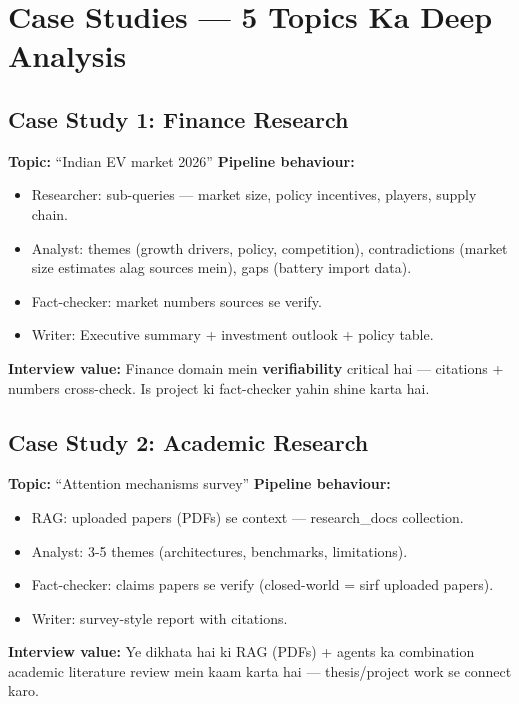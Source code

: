 \section{Case Studies --- 5 Topics Ka Deep Analysis}

\subsection{Case Study 1: Finance Research}

\begin{conceptbox}
\textbf{Topic:} ``Indian EV market 2026'' \textbf{Pipeline behaviour:}
\begin{itemize}
\item Researcher: sub-queries --- market size, policy incentives, players, supply chain.
\item Analyst: themes (growth drivers, policy, competition), contradictions (market size estimates alag sources mein), gaps (battery import data).
\item Fact-checker: market numbers sources se verify.
\item Writer: Executive summary + investment outlook + policy table.
\end{itemize}
\textbf{Interview value:} Finance domain mein \textbf{verifiability} critical hai --- citations + numbers cross-check. Is project ki fact-checker yahin shine karta hai.
\end{conceptbox}

\subsection{Case Study 2: Academic Research}

\begin{conceptbox}
\textbf{Topic:} ``Attention mechanisms survey'' \textbf{Pipeline behaviour:}
\begin{itemize}
\item RAG: uploaded papers (PDFs) se context --- research\_docs collection.
\item Analyst: 3-5 themes (architectures, benchmarks, limitations).
\item Fact-checker: claims papers se verify (closed-world = sirf uploaded papers).
\item Writer: survey-style report with citations.
\end{itemize}
\textbf{Interview value:} Ye dikhata hai ki RAG (PDFs) + agents ka combination academic literature review mein kaam karta hai --- thesis/project work se connect karo.
\end{conceptbox}

